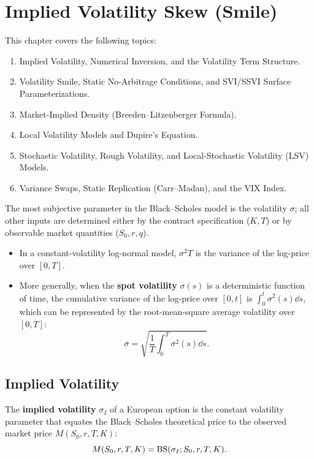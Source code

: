 \chapter{Implied Volatility Skew (Smile)}
\label{ch:implied-volatility}

This chapter covers the following topics:
\begin{enumerate}
    \item Implied Volatility, Numerical Inversion, and the Volatility Term Structure.
    \item Volatility Smile, Static No-Arbitrage Conditions, and SVI/SSVI Surface Parameterizations.
    \item Market-Implied Density (Breeden--Litzenberger Formula).
    \item Local Volatility Models and Dupire's Equation.
    \item Stochastic Volatility, Rough Volatility, and Local-Stochastic Volatility (LSV) Models.
    \item Variance Swaps, Static Replication (Carr--Madan), and the VIX Index.
\end{enumerate}

The most subjective parameter in the Black--Scholes model is the volatility $\sigma$; all other inputs are determined either by the contract specification ($K, T$) or by observable market quantities ($S_0, r, q$).
\begin{itemize}
    \item In a constant-volatility log-normal model, $\sigma^2 T$ is the variance of the log-price over $[0, T]$.
    \item More generally, when the \textbf{spot volatility} $\sigma(s)$ is a deterministic function of time, the cumulative variance of the log-price over $[0, t]$ is $\int_0^t \sigma^2(s)\dd s$, which can be represented by the root-mean-square average volatility over $[0, T]$:
    \[
        \overline{\sigma} = \sqrt{\frac{1}{T}\int_0^T \sigma^2(s)\dd s}.
    \]
\end{itemize}

\section{Implied Volatility}
\label{sec:ch05-implied-vol}

\begin{definition}
    \label{def:ch05-implied-vol}
    The \textbf{implied volatility} $\sigma_I$ of a European option is the constant volatility parameter that equates the Black--Scholes theoretical price to the observed market price $M(S_0, r, T, K)$:
    \[
        M(S_0, r, T, K) = \operatorname{BS}(\sigma_I; S_0, r, T, K).
    \]
\end{definition}

